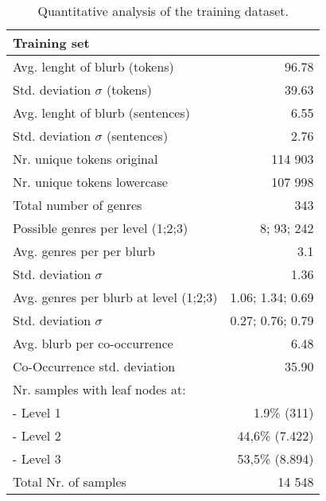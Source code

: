 \documentclass[11pt,a4paper]{article}
\begin{document}
\begin{table}
\small
\begin{center}
\begin{tabular}{|l|r|}
\hline\centering\textbf{Training set}  &                        \\
\hline
Avg. lenght of blurb (tokens)              &  96.78             \\
Std. deviation $\sigma$ (tokens)           &  39.63             \\
Avg. lenght of blurb (sentences)           &  6.55              \\
Std. deviation $\sigma$ (sentences)        &  2.76              \\
\hline
Nr. unique tokens original                 &  114 903           \\
Nr. unique tokens lowercase                &  107 998           \\
\hline
Total number of genres                     &  343               \\
Possible genres per level (1;2;3)          &  8; 93; 242        \\
Avg. genres per per blurb                  &  3.1               \\
Std. deviation $\sigma$                    &  1.36              \\
Avg. genres per blurb at level (1;2;3)     &  1.06; 1.34; 0.69  \\
Std. deviation $\sigma$                    &  0.27; 0.76; 0.79  \\
\hline
Avg. blurb per co-occurrence               &  6.48              \\
Co-Occurrence std. deviation               & 35.90              \\
\hline
Nr. samples with leaf nodes at:            &                    \\
 - Level 1                                 & 1.9\% (311)        \\
 - Level 2                                 & 44,6\% (7.422)     \\
 - Level 3                                 & 53,5\% (8.894)     \\
 \hline
 Total Nr. of samples                      & 14 548             \\
\hline
\end{tabular}
\end{center}
\caption{\label{quantitivy-analysis-train}Quantitative analysis of the training dataset.}
\end{table}
\end{document}
